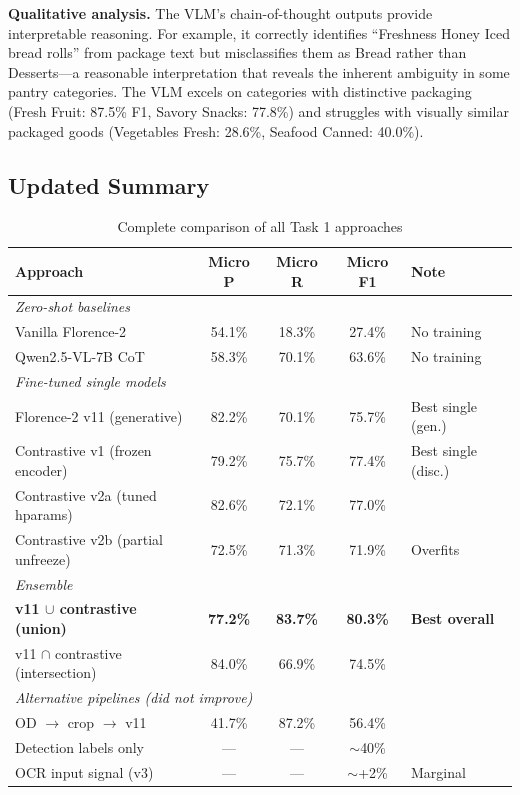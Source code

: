 \textbf{Qualitative analysis.} The VLM's chain-of-thought outputs provide interpretable reasoning. For example, it correctly identifies ``Freshness Honey Iced bread rolls'' from package text but misclassifies them as Bread rather than Desserts—a reasonable interpretation that reveals the inherent ambiguity in some pantry categories. The VLM excels on categories with distinctive packaging (Fresh Fruit: 87.5\% F1, Savory Snacks: 77.8\%) and struggles with visually similar packaged goods (Vegetables Fresh: 28.6\%, Seafood Canned: 40.0\%).

\subsection{Updated Summary}

\begin{table}[h]
\centering
\caption{Complete comparison of all Task 1 approaches}
\label{tab:all_approaches_final}
\small
\begin{tabular}{lcccl}
\toprule
Approach & Micro P & Micro R & Micro F1 & Note \\
\midrule
\multicolumn{5}{l}{\textit{Zero-shot baselines}} \\
\midrule
Vanilla Florence-2 & 54.1\% & 18.3\% & 27.4\% & No training \\
Qwen2.5-VL-7B CoT & 58.3\% & 70.1\% & 63.6\% & No training \\
\midrule
\multicolumn{5}{l}{\textit{Fine-tuned single models}} \\
\midrule
Florence-2 v11 (generative) & 82.2\% & 70.1\% & 75.7\% & Best single (gen.) \\
Contrastive v1 (frozen encoder) & 79.2\% & 75.7\% & 77.4\% & Best single (disc.) \\
Contrastive v2a (tuned hparams) & 82.6\% & 72.1\% & 77.0\% & \\
Contrastive v2b (partial unfreeze) & 72.5\% & 71.3\% & 71.9\% & Overfits \\
\midrule
\multicolumn{5}{l}{\textit{Ensemble}} \\
\midrule
\textbf{v11 $\cup$ contrastive (union)} & \textbf{77.2\%} & \textbf{83.7\%} & \textbf{80.3\%} & \textbf{Best overall} \\
v11 $\cap$ contrastive (intersection) & 84.0\% & 66.9\% & 74.5\% & \\
\midrule
\multicolumn{5}{l}{\textit{Alternative pipelines (did not improve)}} \\
\midrule
OD $\rightarrow$ crop $\rightarrow$ v11 & 41.7\% & 87.2\% & 56.4\% & \\
Detection labels only & --- & --- & $\sim$40\% & \\
OCR input signal (v3) & --- & --- & $\sim$+2\% & Marginal \\
\bottomrule
\end{tabular}
\end{table}
